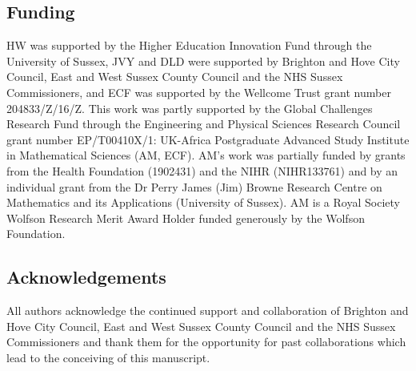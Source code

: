 \documentclass{article}
\begin{document}
\subsection*{Funding}
{HW was supported by the Higher Education Innovation Fund through the University of Sussex, JVY and DLD were supported by Brighton and Hove City Council, East and West Sussex County Council and the NHS Sussex Commissioners, and ECF was supported by the Wellcome Trust grant number 204833/Z/16/Z. This work was partly supported by the Global Challenges Research Fund through the Engineering and Physical Sciences Research Council grant number EP/T00410X/1: UK-Africa Postgraduate Advanced Study Institute in Mathematical Sciences (AM, ECF). AM's work was partially funded by grants from the Health Foundation (1902431) and the NIHR (NIHR133761) and by an individual grant  from the Dr Perry James (Jim) Browne Research Centre on Mathematics and its Applications (University of Sussex). AM is a Royal Society Wolfson Research Merit Award Holder funded generously by the Wolfson Foundation.}

\subsection*{Acknowledgements}
{All authors acknowledge the continued support and collaboration of Brighton and Hove City Council, East and West Sussex County Council and the NHS Sussex Commissioners and thank them for the opportunity for past collaborations which lead to the conceiving of this manuscript.}

\end{document}
